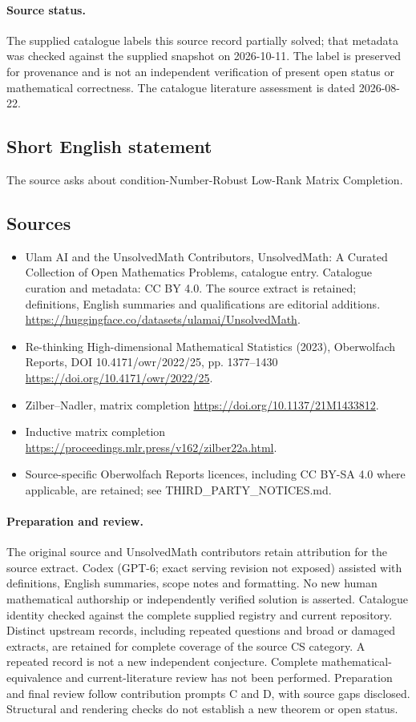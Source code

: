 \documentclass[11pt]{article}
\begin{document}
\paragraph{Source status.}
The supplied catalogue labels this source record partially solved; that metadata was checked against the supplied snapshot on 2026-10-11. The label is preserved for provenance and is not an independent verification of present open status or mathematical correctness. The catalogue literature assessment is dated 2026-08-22.
\subsection{Short English statement}
The source asks about condition-Number-Robust Low-Rank Matrix Completion.
\subsection{Sources}
\begin{itemize}
\item[S1] Ulam AI and the UnsolvedMath Contributors, UnsolvedMath: A Curated Collection of Open Mathematics Problems, catalogue entry. Catalogue curation and metadata: CC BY 4.0. The source extract is retained; definitions, English summaries and qualifications are editorial additions.
\url{https://huggingface.co/datasets/ulamai/UnsolvedMath}.
\item[S2] Re-thinking High-dimensional Mathematical Statistics (2023), Oberwolfach Reports, DOI 10.4171/owr/2022/25, pp. 1377--1430
\url{https://doi.org/10.4171/owr/2022/25}.
\item[S3] Zilber--Nadler, matrix completion
\url{https://doi.org/10.1137/21M1433812}.
\item[S4] Inductive matrix completion
\url{https://proceedings.mlr.press/v162/zilber22a.html}.
\item Source-specific Oberwolfach Reports licences, including CC BY-SA 4.0 where applicable, are retained; see THIRD\_PARTY\_NOTICES.md.
\end{itemize}
\paragraph{Preparation and review.}
The original source and UnsolvedMath contributors retain attribution for the source extract. Codex (GPT-6; exact serving revision not exposed) assisted with definitions, English summaries, scope notes and formatting. No new human mathematical authorship or independently verified solution is asserted. Catalogue identity checked against the complete supplied registry and current repository. Distinct upstream records, including repeated questions and broad or damaged extracts, are retained for complete coverage of the source CS category. A repeated record is not a new independent conjecture. Complete mathematical-equivalence and current-literature review has not been performed. Preparation and final review follow contribution prompts C and D, with source gaps disclosed. Structural and rendering checks do not establish a new theorem or open status.
\label{end:statement}
\end{document}
